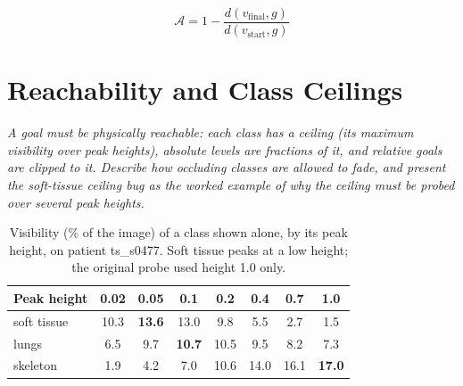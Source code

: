 \documentclass[12pt, a4paper]{book}
\newcommand{\plan}[1]{{\color{gray}\itshape #1\par}}
\newcommand{\att}{\mathcal{A}}            %
\newcommand{\vis}{v}                      %
\begin{document}
\begin{equation}
  \att = 1 - \frac{d(\vis_{\text{final}}, g)}{d(\vis_{\text{start}}, g)}
  \label{eq:attainment}
\end{equation}

\section{Reachability and Class Ceilings}
\label{sec:task-reachability}
\plan{A goal must be physically reachable: each class has a ceiling (its maximum visibility over peak heights), absolute levels are fractions of it, and relative goals are clipped to it. Describe how occluding classes are allowed to fade, and present the soft-tissue ceiling bug as the worked example of why the ceiling must be probed over several peak heights.}

\begin{table}[ht]
  \centering
  \caption[Ceiling probe]{Visibility (\% of the image) of a class shown alone, by its peak height, on patient ts\_s0477. Soft tissue peaks at a low height; the original probe used height 1.0 only.}
  \label{tab:task-ceiling}
  \begin{tabular}{lccccccc}
    \toprule
    Peak height & 0.02 & 0.05 & 0.1 & 0.2 & 0.4 & 0.7 & 1.0 \\
    \midrule
    soft tissue & 10.3 & \textbf{13.6} & 13.0 & 9.8 & 5.5 & 2.7 & 1.5 \\
    lungs       & 6.5 & 9.7 & \textbf{10.7} & 10.5 & 9.5 & 8.2 & 7.3 \\
    skeleton    & 1.9 & 4.2 & 7.0 & 10.6 & 14.0 & 16.1 & \textbf{17.0} \\
    \bottomrule
  \end{tabular}
\end{table}
\end{document}
